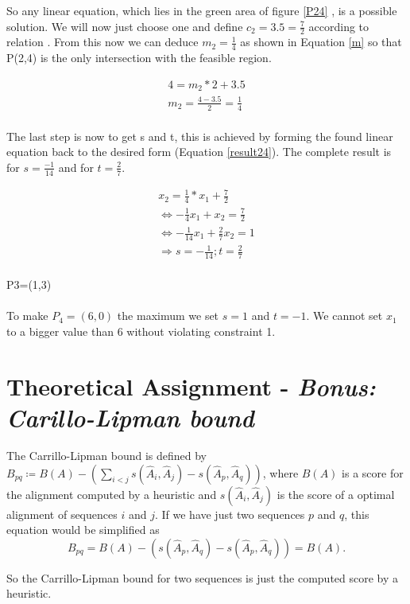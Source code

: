 \documentclass[%
   10pt,              %
   nenglish,           %
   a4paper,           %
   DIV11,             %
]{scrartcl}%
\begin{document}
 So any linear equation, which lies in the green area of figure \ref{P24} , is a possible solution. We will now just choose one and define $c_2 = 3.5 = \frac{7}{2}$ according to relation \label{rel2}. From this now we can deduce $m_2=\frac{1}{4}$ as shown in Equation \ref{m} so that P(2,4) is the only intersection with the feasible region.

\begin{eqnarray}
4=m_2 * 2+3.5\\
m_2 = \frac{4-3.5}{2}  = \frac{1}{4} \label{m}\\
\end{eqnarray}

The last step is now to get s and t, this is achieved by forming the found linear equation back to the desired form (Equation \ref{result24}). The complete result is for $s=\frac{-1}{14}$ and for $t= \frac{2}{7}$.

\begin{eqnarray}
x_2=\frac{1}{4} * x_1 + \frac{7}{2}\\
 	\Leftrightarrow 	- \frac{1}{4} x_1 + x_2=\frac{7}{2}\\
 	\Leftrightarrow 	- \frac{1}{14} x_1 + \frac{2}{7} x_2 = 1 \label{result24}\\
\Rightarrow s= - \frac{1}{14} ; t=\frac{2}{7}\\
\end{eqnarray}


P3=(1,3)\\
\\
\noindent To make $P_4=(6,0)$ the maximum we set $s = 1$ and $t = -1$. We cannot set $x_1$ to a bigger value 
than 6 without violating constraint 1.


\section*{Theoretical Assignment - \textsl{Bonus: Carillo-Lipman bound}}

The Carrillo-Lipman bound is defined by $B_{pq} \coloneqq B(A) - (\sum_{i<j} s(\hat{A}_i, \hat{A}_j)-s(\hat{A}_p,\hat{A}_q))$, 
where $B(A)$ is a score for the alignment computed by a heuristic and $s(\hat{A}_i,\hat{A}_j)$ is 
the score of a optimal alignment of sequences $i$ and $j$. If we have just two sequences $p$ and $q$, 
this equation would be simplified as 
\[
B_{pq} = B(A) - (s(\hat{A}_p,\hat{A}_q)-s(\hat{A}_p,\hat{A}_q)) = B(A).
\]

\noindent So the Carrillo-Lipman bound for two sequences is just the computed score by a heuristic.
%
%
 
\end{document}
